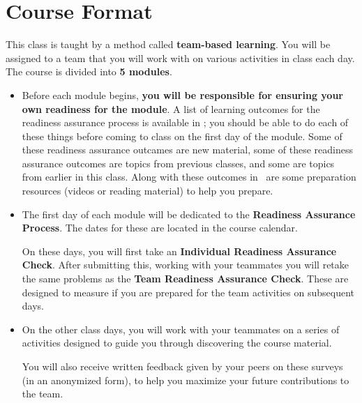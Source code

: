 \documentclass{article}
\begin{document}
\section*{\fontsize{12}{15}\selectfont Course Format}

    This class is taught by a method called {\bf team-based learning}.  You will be assigned to a team that you will work with on various activities in class each day.  The course is divided into {\bf 5 modules}.
    \begin{itemize}
    \item Before each module begins, {\bf you will be responsible for ensuring your own readiness for the module}.  A list of learning outcomes for the readiness assurance process is available in \LMS; you should be able to do each of these things before coming to class on the first day of the module.  Some of these readiness assurance outcames are new material, some of these readiness assurance outcomes are topics from previous classes, and some are topics from earlier in this class.  Along with these outcomes in \LMS\ are some preparation resources (videos or reading material) to help you prepare.
    \item The first day of each module will be dedicated to the {\bf Readiness Assurance Process}.  The dates for these are located in the course calendar.


    On these days, you will first take an {\bf Individual Readiness Assurance Check}.  After submitting this, working with your teammates you will retake the same problems as the {\bf Team Readiness Assurance Check}.  These are designed to measure if you are prepared for the team activities on subsequent days.

    \item On the other class days, you will work with your teammates on a series of activities designed to guide you through discovering the course material.

    You will also receive written feedback given by your peers on these surveys (in an anonymized form), to help you maximize your future contributions to the team.

    \end{itemize}
\end{document}
